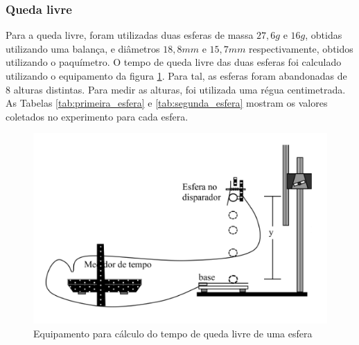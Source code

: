 \documentclass[10pt]{article}
\begin{document}
\subsubsection{Queda livre}

Para a queda livre, foram utilizadas duas esferas de massa  $27,6g$ e $16g$, obtidas utilizando uma balança, e diâmetros $18,8mm$ e $15,7mm$ respectivamente, obtidos utilizando o paquímetro. O tempo de queda livre das duas esferas foi calculado utilizando o equipamento da figura \ref{fig:queda_livre}. Para tal, as esferas foram abandonadas de 8 alturas distintas. Para medir as alturas, foi utilizada uma régua centimetrada. As Tabelas \ref{tab:primeira_esfera} e \ref{tab:segunda_esfera} mostram os valores coletados no experimento para cada esfera.

\begin{figure}
	\begin{center}
		\includegraphics[scale=0.5]{queda_livre.png}
		\caption{Equipamento para cálculo do tempo de queda livre de uma esfera}
		\label{fig:queda_livre}
	\end{center}
\end{figure}
\end{document}
